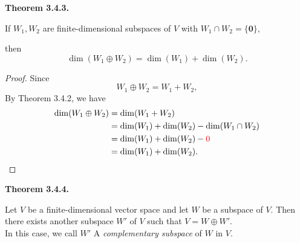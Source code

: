 \documentclass[12pt]{article}
\begin{document}
\textbf{Theorem 3.4.3.}

If $W_1,W_2$ are finite-dimensional subspaces of $V$ with $W_1\cap W_2=\{\mathbf{0}\}$,

then
\[
\dim(W_1\oplus W_2)
=
\dim(W_1)+\dim(W_2).
\]

\begin{proof}

Since
\[
W_1\oplus W_2=W_1+W_2,
\]
By Theorem 3.4.2, we have
\[
\begin{aligned}
\dim(W_1\oplus W_2)
&=\dim(W_1+W_2) \\
&=\dim(W_1)+\dim(W_2)-\dim(W_1\cap W_2) \\
&=\dim(W_1)+\dim(W_2)-\textcolor{red}{0} \\
&=\dim(W_1)+\dim(W_2).
\end{aligned}
\]

\end{proof}

\newpage

\textbf{Theorem 3.4.4.}

Let $V$ be a finite-dimensional vector space and let $W$ be a subspace of $V$.
Then there exists another subspace $W'$ of $V$ such that $V=W\oplus W'$.\\

In this case, we call $W'$ A \emph{complementary subspace} of $W$ in $V$.
\end{document}
